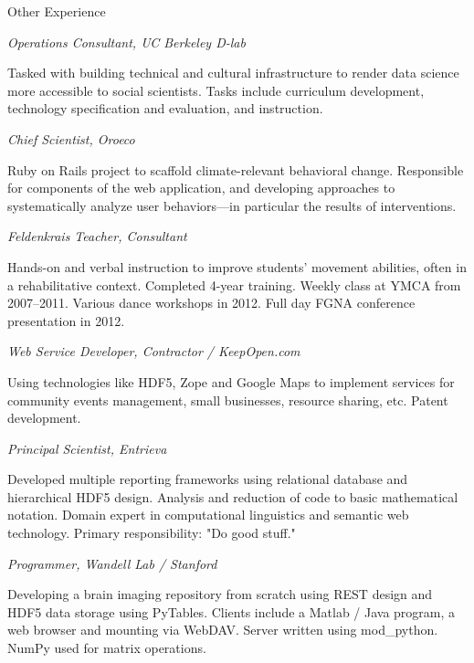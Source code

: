 \begin{rubric}{Other Experience}

\entry*[2013] \emph{Operations Consultant, UC Berkeley D-lab}
    \par Tasked with building technical and cultural infrastructure to render
    data science more accessible to social scientists. Tasks include curriculum
    development, technology specification and evaluation, and instruction.

\entry*[2012--present] \emph{Chief Scientist, Oroeco}
    \par Ruby on Rails project to scaffold climate-relevant behavioral change.
    Responsible for components of the web application, and developing approaches
    to systematically analyze user behaviors---in particular the results of
    interventions.

\entry*[2007--present] \emph{Feldenkrais Teacher, Consultant}
    \par  Hands-on and verbal instruction to improve students' movement
    abilities, often in a rehabilitative context.
    Completed 4-year training. Weekly class at YMCA from 2007--2011. Various
    dance workshops in 2012. Full day FGNA conference presentation in 2012.


\entry*[2004--present] \emph{Web Service Developer, Contractor / KeepOpen.com}
    \par Using technologies like HDF5, Zope and Google Maps to implement services
    for community events management, small businesses, resource sharing, etc.
    Patent development.

\entry*[2006--2007] \emph{Principal Scientist, Entrieva}
    \par Developed multiple reporting frameworks using relational database and
    hierarchical HDF5 design.  Analysis and reduction of code to basic
    mathematical notation.  Domain expert in computational linguistics and
    semantic web technology.  Primary responsibility: "Do good stuff."

\entry*[2006] \emph{Programmer, Wandell Lab / Stanford}
    \par Developing a brain imaging repository from scratch using REST design
    and HDF5 data storage using PyTables.  Clients include a Matlab /
    Java program, a web browser and mounting via WebDAV.  Server
    written using mod_python.  NumPy used for matrix operations.


\end{rubric}

